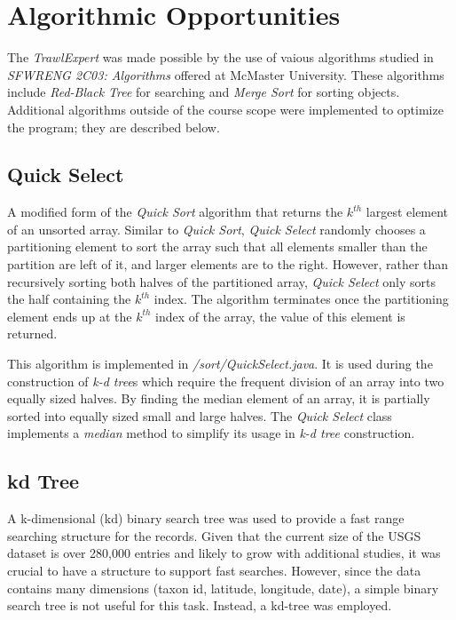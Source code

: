 \documentclass{article}
\begin{document}
\section{Algorithmic Opportunities}
The \textit{TrawlExpert} was made possible by the use of vaious algorithms studied in \textit{SFWRENG 2C03: Algorithms} offered at McMaster University. These algorithms include \textit{Red-Black Tree} for searching and \textit{Merge Sort} for sorting objects. Additional algorithms outside of the course scope were implemented to optimize the program; they are described below. 

\subsection{Quick Select}
A modified form of the \textit{Quick Sort} algorithm that returns the $k^{th}$ largest element of an unsorted array. Similar to \textit{Quick Sort}, \textit{Quick Select} randomly chooses a partitioning element to sort the array such that all elements smaller than the partition are left of it, and larger elements are to the right. However, rather than recursively sorting both halves of the partitioned array, \textit{Quick Select} only sorts the half containing the $k^{th}$ index. The algorithm terminates once the partitioning element ends up at the $k^{th}$ index of the array, the value of this element is returned.

This algorithm is implemented in \textit{/sort/QuickSelect.java}. It is used during the construction of \textit{k-d tree}s which require the frequent division of an array into two equally sized halves. By finding the median element of an array, it is partially sorted into equally sized small and large halves. The \textit{Quick Select} class implements a \textit{median} method to simplify its usage in \textit{k-d tree} construction. 


\subsection{kd Tree}
A k-dimensional (kd) binary search tree was used to provide a fast range searching structure for the records. Given that the current size of the USGS dataset is over 280,000 entries and likely to grow with additional studies, it was crucial to have a structure to support fast searches. However, since the data contains many dimensions (taxon id, latitude, longitude, date), a simple binary search tree is not useful for this task. Instead, a kd-tree was employed.
\end{document}
